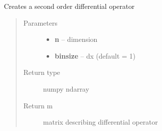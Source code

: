 \documentclass[letterpaper,10pt,english]{sphinxmanual}
\begin{document}

\begin{fulllineitems}
\label{utility_functions:utility_functions.diffop}
Creates a second order differential operator
\begin{quote}\begin{description}
\item[{Parameters}] \leavevmode\begin{itemize}
\item {} 
\textbf{n} -- dimension

\item {} 
\textbf{binsize} -- dx (default = 1)

\end{itemize}

\item[{Return type}] \leavevmode
numpy ndarray

\item[{Return m}] \leavevmode
matrix describing differential operator

\end{description}\end{quote}

\end{fulllineitems}

\end{document}
